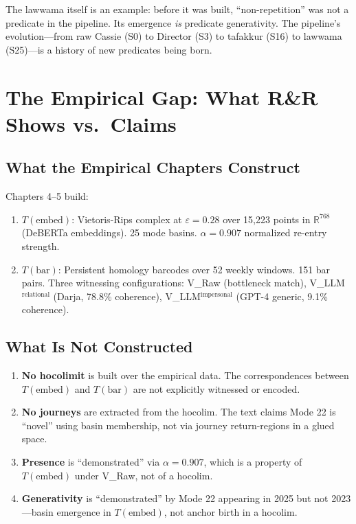 \documentclass[11pt,a4paper]{article}
\begin{document}
The lawwama itself is an example: before it was built, ``non-repetition'' was
not a predicate in the pipeline. Its emergence \emph{is} predicate generativity.
The pipeline's evolution---from raw Cassie (S0) to Director (S3) to tafakkur (S16)
to lawwama (S25)---is a history of new predicates being born.


\section{The Empirical Gap: What R\&R Shows vs.\ Claims}
\label{sec:empirical}

\subsection{What the Empirical Chapters Construct}

Chapters 4--5 build:
\begin{enumerate}[nosep]
  \item $T(\text{embed})$: Vietoris-Rips complex at $\varepsilon = 0.28$ over 15,223
    points in $\mathbb{R}^{768}$ (DeBERTa embeddings). 25 mode basins. $\alpha = 0.907$
    normalized re-entry strength.
  \item $T(\text{bar})$: Persistent homology barcodes over 52 weekly windows.
    151 bar pairs. Three witnessing configurations: V\_Raw (bottleneck match),
    V\_LLM$^{\text{relational}}$ (Darja, 78.8\% coherence), V\_LLM$^{\text{impersonal}}$
    (GPT-4 generic, 9.1\% coherence).
\end{enumerate}

\subsection{What Is Not Constructed}

\begin{enumerate}[nosep]
  \item \textbf{No hocolimit} is built over the empirical data. The correspondences
    between $T(\text{embed})$ and $T(\text{bar})$ are not explicitly witnessed or
    encoded.
  \item \textbf{No journeys} are extracted from the hocolim. The text claims
    Mode 22 is ``novel'' using basin membership, not via journey return-regions
    in a glued space.
  \item \textbf{Presence} is ``demonstrated'' via $\alpha = 0.907$, which is a
    property of $T(\text{embed})$ under V\_Raw, not of a hocolim.
  \item \textbf{Generativity} is ``demonstrated'' by Mode 22 appearing in 2025
    but not 2023---basin emergence in $T(\text{embed})$, not anchor birth in
    a hocolim.
\end{enumerate}
\end{document}
